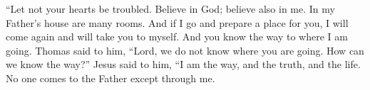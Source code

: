 \documentclass[12pt]{scrbook}
\begin{document}
\begin{scripture}
 \redletteron ``Let not your hearts be troubled. Believe in God; believe also in me.\redletteroff {} \redletteron In my Father's house are many rooms.\redletteroff {} \redletteron And if I go and prepare a place for you, I will come again and will take you to myself.\redletteroff {} \redletteron And you know the way to where I am going.\redletteroff {} Thomas said to him, ``Lord, we do not know where you are going. How can we know the way?''  Jesus said to him, \redletteron ``I am the way, and the truth, and the life. No one comes to the Father except through me.\redletteroff
\end{scripture}
\end{document}

